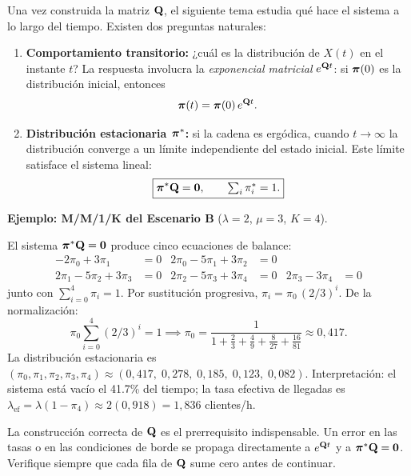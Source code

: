 \documentclass[11pt, letterpaper]{article}
\begin{document}
Una vez construida la matriz $\mathbf{Q}$, el siguiente tema estudia qué hace el sistema a lo largo del tiempo. Existen dos preguntas naturales:

\begin{enumerate}
    \item \textbf{Comportamiento transitorio:} ¿cuál es la distribución de $X(t)$ en el instante $t$? La respuesta involucra la \emph{exponencial matricial} $e^{\mathbf{Q}t}$: si $\boldsymbol{\pi}(0)$ es la distribución inicial, entonces
    \[
    \boldsymbol{\pi}(t) = \boldsymbol{\pi}(0)\, e^{\mathbf{Q}t}.
    \]

    \item \textbf{Distribución estacionaria $\boldsymbol{\pi}^*$:} si la cadena es ergódica, cuando $t\to\infty$ la distribución converge a un límite independiente del estado inicial. Este límite satisface el sistema lineal:
    \[
    \boxed{\boldsymbol{\pi}^* \mathbf{Q} = \boldsymbol{0}, \qquad \textstyle\sum_i \pi^*_i = 1.}
    \]
\end{enumerate}

\textbf{Ejemplo: M/M/1/K del Escenario B} ($\lambda=2$, $\mu=3$, $K=4$).

El sistema $\boldsymbol{\pi}^*\mathbf{Q}=\boldsymbol{0}$ produce cinco ecuaciones de balance:
\begin{align*}
-2\pi_0 + 3\pi_1 &= 0 & 2\pi_0 - 5\pi_1 + 3\pi_2 &= 0 \\
2\pi_1 - 5\pi_2 + 3\pi_3 &= 0 & 2\pi_2 - 5\pi_3 + 3\pi_4 &= 0 & 2\pi_3 - 3\pi_4 &= 0
\end{align*}
junto con $\sum_{i=0}^4 \pi_i = 1$. Por sustitución progresiva, $\pi_i = \pi_0\,(2/3)^i$. De la normalización:
\[
\pi_0\sum_{i=0}^4 (2/3)^i = 1 \implies \pi_0 = \frac{1}{1+\tfrac{2}{3}+\tfrac{4}{9}+\tfrac{8}{27}+\tfrac{16}{81}} \approx 0{,}417.
\]
La distribución estacionaria es $(\pi_0,\pi_1,\pi_2,\pi_3,\pi_4) \approx (0{,}417,\;0{,}278,\;0{,}185,\;0{,}123,\;0{,}082)$. Interpretación: el sistema está vacío el 41.7\% del tiempo; la tasa efectiva de llegadas es $\lambda_{\text{ef}} = \lambda(1-\pi_4) \approx 2(0{,}918) = 1{,}836$ clientes/h.

\begin{alertabox}
La construcción correcta de $\mathbf{Q}$ es el prerrequisito indispensable. Un error en las tasas o en las condiciones de borde se propaga directamente a $e^{\mathbf{Q}t}$ y a $\boldsymbol{\pi}^*\mathbf{Q}=\boldsymbol{0}$. Verifique siempre que cada fila de $\mathbf{Q}$ sume cero antes de continuar.
\end{alertabox}

\vfill
\end{document}

